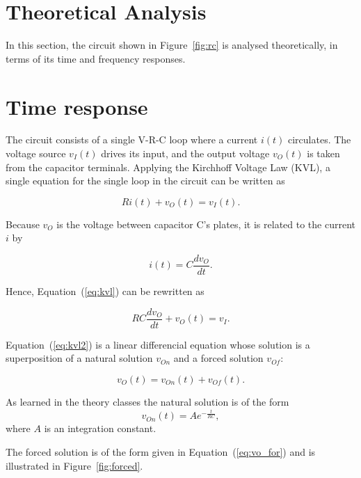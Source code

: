 \section{Theoretical Analysis}
\label{sec:analysis}

In this section, the circuit shown in Figure~\ref{fig:rc} is analysed theoretically, in terms of its time and frequency responses.

\section{Time response}

The circuit consists of a single V-R-C loop where a current $i(t)$ circulates. The voltage source $v_I(t)$ drives its input, and the output voltage $v_O(t)$ is taken from the capacitor terminals. Applying the Kirchhoff Voltage Law (KVL), a single equation for the single loop in the circuit can be written as


\begin{equation}
  Ri(t) + v_O(t) = v_I(t).
  \label{eq:kvl}
\end{equation}


Because $v_O$ is the voltage between capacitor C's plates, it is related to the current $i$ by

\begin{equation}
  i(t) = C\frac{dv_O}{dt}.
\end{equation}

Hence, Equation~(\ref{eq:kvl}) can be rewritten as


\begin{equation}
  RC\frac{dv_O}{dt} + v_O(t) = v_I.
  \label{eq:kvl2}
\end{equation}


Equation~(\ref{eq:kvl2}) is a linear differencial equation whose solution is a superposition of a natural solution $v_{On}$ and a forced solution $v_{Of}$:

\begin{equation}
  v_O(t) = v_{On}(t) + v_{Of}(t).
  \label{eq:vo_sol}
\end{equation}

As learned in the theory classes the natural solution is of the form
\begin{equation}
  v_{On}(t) = Ae^{-\frac{t}{RC}},
  \label{eq:vo_nat}
\end{equation}
where $A$ is an integration constant.


The forced solution is of the form given in Equation~(\ref{eq:vo_for}) and is illustrated in Figure~\ref{fig:forced}.

